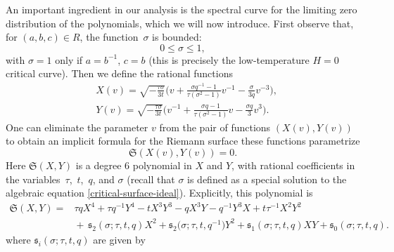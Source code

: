 \documentclass[10pt,a4paper]{amsart}
\numberwithin{equation}{section}
\begin{document}
 An important ingredient in our analysis is the spectral curve for the limiting zero distribution of the polynomials, which we will now introduce. First
 observe that, for $(a,b,c)\in R$, the function~$\sigma$ is bounded:
 \begin{equation*}
 0 \leq \sigma \leq 1,
 \end{equation*}
 with $\sigma = 1$ only if $a=b^{-1}$, $c=b$ (this is precisely the low-temperature $H=0$ critical curve).
 Then we define the rational functions
 \begin{align} \label{Xv}
 &X(v) = \sqrt{-\frac{\tau \sigma}{3t}}\biggl(v + \frac{\sigma q^{-1} -1}{\tau(\sigma^2-1)} v^{-1} - \frac{\sigma}{3q}v^{-3}\biggr),\\
 &Y(v) = \sqrt{-\frac{\tau \sigma}{3t}}\biggl(v^{-1} + \frac{\sigma q -1}{\tau(\sigma^2-1)} v - \frac{\sigma q}{3}v^{3}\biggr).\label{Yv}
 \end{align}
One can eliminate the parameter $v$ from the pair of functions $(X(v),Y(v))$ to obtain an implicit formula for the Riemann surface these functions parametrize
 \begin{equation*}
 \mathfrak{S}(X(v),Y(v)) = 0.
 \end{equation*}
Here $\mathfrak{S}(X,Y)$ is a degree $6$ polynomial in $X$ and $Y$, with rational coefficients in the variables~$\tau$,~$t$,~$q$, and $\sigma$ (recall that $\sigma$ is defined as a special solution to the algebraic equation \eqref{critical-surface-ideal}). Explicitly, this polynomial is
 \begin{align*}
 \mathfrak{S}(X,Y)={}& \tau q X^4 + \tau q^{-1}Y^4 -tX^3Y^3 - qX^3Y - q^{-1}Y^3X + t\tau^{-1}X^2Y^2\\
 &{}{+}\, \mathfrak{s}_2(\sigma;\tau,t,q) X^2 + \mathfrak{s}_2\bigl(\sigma;\tau,t,q^{-1}\bigr) Y^2 + \mathfrak{s}_1(\sigma;\tau,t,q) XY + \mathfrak{s}_0(\sigma;\tau,t,q).\nonumber
 \end{align*}
where $\mathfrak{s}_i(\sigma;\tau,t,q)$ are given by
\end{document}
